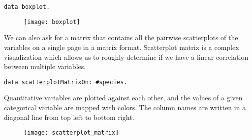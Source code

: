 \documentclass[sigplan]{acmart}
\begin{document}
\begin{lstlisting}[basicstyle=\small,language=Smalltalk]
data boxplot.
\end{lstlisting}
\begin{figure}[H]
  \begin{center}
  \texttt{[image: boxplot]}
  \end{center}
\end{figure}

%
%

We can also ask for a matrix that contains all the pairwise scatterplots of the variables on a single page in a matrix format. Scatterplot matrix is a complex visualization which allows us to roughly determine if we have a linear correlation between multiple variables.

\begin{lstlisting}[basicstyle=\small,language=Smalltalk]
data scatterplotMatrixOn: #species.
\end{lstlisting}

Quantitative variables are plotted against each other, and the values of a given categorical variable are mapped with colors. The column names are written in a diagonal line from top left to bottom right.

\begin{figure}[H]
  \begin{center}
  \texttt{[image: scatterplot\_matrix]}
  \end{center}
\end{figure}

%
%
\end{document}
